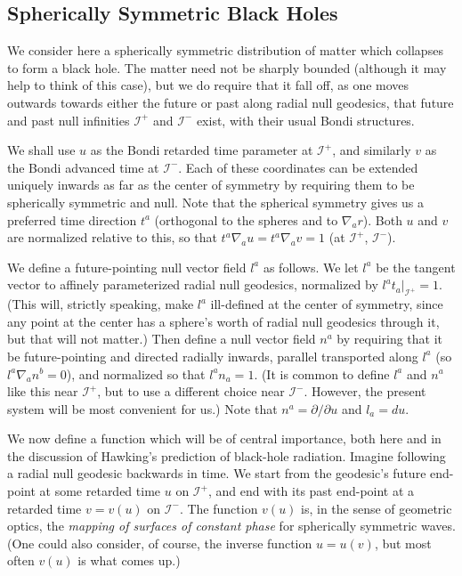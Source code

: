 \documentclass[12pt]{article}
\newcommand{\scrif}{{{\mathscr I}^{+}}}
\newcommand{\scrip}{{{\mathscr I}^{-}}}
\newcommand{\vv}{{v}}
\newcommand{\uu}{{u}}
\begin{document}
\subsection{Spherically Symmetric Black Holes}\label{sphol}

We consider here a spherically symmetric distribution of matter which collapses to form a black hole.  The matter need not be sharply bounded (although it may help to think of this case), but we do require that it fall off, as one moves outwards towards either the future or past along radial null geodesics, that future and past null infinities $\scrif$ and $\scrip$ exist, with their usual Bondi structures.  

We shall use $u$ as the Bondi retarded time parameter at $\scrif$, and similarly $v$ as the Bondi advanced time at $\scrip$.  
Each of these coordinates can be extended uniquely inwards as far as the center of symmetry by requiring them to be spherically symmetric and null.
Note that the spherical symmetry gives us a preferred time direction $t^a$ (orthogonal to the spheres and to $\nabla _a r$).  Both $u$ and $v$ are normalized relative to this, so that $t^a\nabla _au=t^a\nabla _av=1$ (at $\scrif$, $\scrip$).

We define a future-pointing null vector field $l^a$ as follows.  We let $l^a$ be the tangent vector to affinely parameterized radial null geodesics, normalized by 
$l^at_a\Bigr| _\scrif =1$.  (This will, strictly speaking, make $l^a$ ill-defined at the center of symmetry, since any point at the center has a sphere's worth of radial null geodesics through it, but that will not matter.)  Then define a null vector field $n^a$ by requiring that it be future-pointing and directed radially inwards, parallel transported along $l^a$ (so $l^a\nabla _a n^b=0$), and normalized so that $l^an_a=1$.  (It is common to define $l^a$ and $n^a$ like this near $\scrif$, but to use a different choice near $\scrip$.  However, the present system will be most convenient for us.)  Note that $n^a=\partial /\partial u$ and $l_a=du$.

We now define a function which will be of central importance, both here and in the discussion of Hawking's prediction of black-hole radiation.  Imagine following a radial null geodesic backwards in time.  We start from the geodesic's future end-point at some retarded time $u$ on $\scrif$, and end with its past end-point at a retarded time $v=\vv (u)$ on $\scrip$.  The function $\vv (u)$ is, in the sense of geometric optics, the {\em mapping of surfaces of constant phase} for spherically symmetric waves.  (One could also consider, of course, the inverse function $u=\uu (v)$, but most often $\vv (u)$ is what comes up.)
\end{document}
